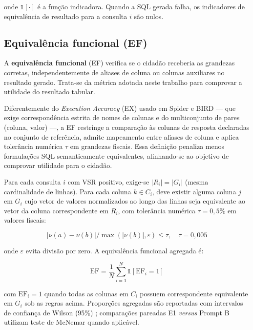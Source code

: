 onde $\mathbb{1}[\cdot]$ é a função indicadora. Quando a SQL gerada falha, os indicadores de equivalência de resultado para a consulta $i$ são nulos.

\subsection{Equivalência funcional (EF)}

A \textbf{equivalência funcional} (EF) verifica se o cidadão receberia as grandezas corretas, independentemente de aliases de coluna ou colunas auxiliares no resultado gerado. Trata-se da métrica adotada neste trabalho para comprovar a utilidade do resultado tabular.

Diferentemente do \textit{Execution Accuracy} (EX) usado em Spider e BIRD --- que exige correspondência estrita de nomes de colunas e do multiconjunto de pares (coluna, valor) ---, a EF restringe a comparação às colunas de resposta declaradas no conjunto de referência, admite mapeamento entre aliases de coluna e aplica tolerância numérica $\tau$ em grandezas fiscais. Essa definição penaliza menos formulações SQL semanticamente equivalentes, alinhando-se ao objetivo de comprovar utilidade para o cidadão.

Para cada consulta $i$ com VSR positivo, exige-se $|R_i| = |G_i|$ (mesma cardinalidade de linhas). Para cada coluna $k \in C_i$, deve existir alguma coluna $j$ em $G_i$ cujo vetor de valores normalizados ao longo das linhas seja equivalente ao vetor da coluna correspondente em $R_i$, com tolerância numérica $\tau = 0{,}5\%$ em valores fiscais:

\begin{equation}
\left|\nu(a) - \nu(b)\right| / \max\!\left(|\nu(b)|, \varepsilon\right) \leq \tau, \quad \tau = 0{,}005
\end{equation}

onde $\varepsilon$ evita divisão por zero. A equivalência funcional agregada é:

\begin{equation}
\text{EF} = \frac{1}{N} \sum_{i=1}^{N} \mathbb{1}\!\left[\text{EF}_i = 1\right]
\end{equation}

com $\text{EF}_i = 1$ quando todas as colunas em $C_i$ possuem correspondente equivalente em $G_i$ sob as regras acima. Proporções agregadas são reportadas com intervalos de confiança de Wilson (95\%) \cite{Agresti1998}; comparações pareadas E1 \textit{versus} Prompt B utilizam teste de McNemar quando aplicável.

